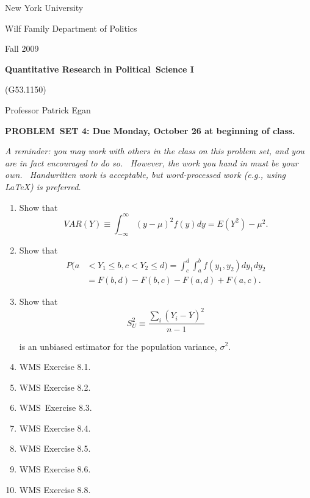 \documentclass[11pt]{article}
\begin{document}
New York University

Wilf Family Department of Politics

Fall 2009

\begin{center}
{\large \textbf{Quantitative Research in Political\ Science I}}

(G53.1150)

Professor Patrick Egan

\bigskip

\textbf{PROBLEM\ SET 4: Due Monday, October 26 at beginning of class.}
\end{center}

\textit{A reminder: you may work with others in the class on this problem
set, and you are in fact encouraged to do so. \ However, the work you hand
in must be your own. \ Handwritten work is acceptable, but word-processed
work (e.g., using LaTeX) is preferred.}

\bigskip

\begin{enumerate}
\item Show that%
\begin{equation*}
VAR(Y)\equiv \int_{-\infty }^{\infty }(y-\mu )^{2}f(y)dy=E(Y^{2})-\mu ^{2}.
\end{equation*}

\item Show that%
\begin{align*}
P(a& <Y_{1}\leq b,c<Y_{2}\leq
d)=\int_{c}^{d}\int_{a}^{b}f(y_{1},y_{2})dy_{1}dy_{2} \\
& =F(b,d)-F(b,c)-F(a,d)+F(a,c).
\end{align*}

\item Show that%
\begin{equation*}
S_{U}^{2}\equiv \frac{\sum\nolimits_{i}\left( Y_{i}-\overline{Y}\right) ^{2}%
}{n-1}
\end{equation*}

is an unbiased estimator for the population variance, $\sigma ^{2}.$\medskip 

\item WMS Exercise 8.1.

\item WMS Exercise 8.2.

\item WMS\ Exercise 8.3.

\item WMS Exercise 8.4.

\item WMS Exercise 8.5.

\item WMS Exercise 8.6.

\item WMS Exercise 8.8.
\end{enumerate}
\end{document}
